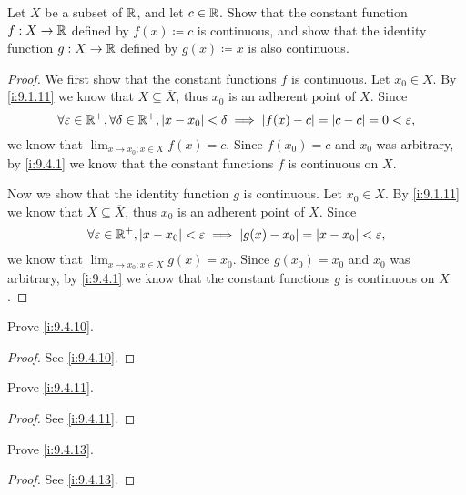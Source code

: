 \begin{ex}\label{i:ex:9.4.2}
  Let \(X\) be a subset of \(\mathbb{R}\), and let \(c \in \mathbb{R}\).
  Show that the constant function \(f : X \to \mathbb{R}\) defined by \(f(x) \coloneqq c\) is continuous, and show that the identity function \(g : X \to \mathbb{R}\) defined by \(g(x) \coloneqq x\) is also continuous.
\end{ex}

\begin{proof}
  We first show that the constant functions \(f\) is continuous.
  Let \(x_0 \in X\).
  By \cref{i:9.1.11} we know that \(X \subseteq \overline{X}\), thus \(x_0\) is an adherent point of \(X\).
  Since
  \[
    \forall \varepsilon \in \mathbb{R}^+, \forall \delta \in \mathbb{R}^+, \left\lvert x - x_0\right\rvert < \delta \implies \left\lvert f(x) - c\right\rvert = \left\lvert c - c\right\rvert = 0 < \varepsilon,
  \]
  we know that \(\lim_{x \to x_0 ; x \in X} f(x) = c\).
  Since \(f(x_0) = c\) and \(x_0\) was arbitrary, by \cref{i:9.4.1} we know that the constant functions \(f\) is continuous on \(X\).

  Now we show that the identity function \(g\) is continuous.
  Let \(x_0 \in X\).
  By \cref{i:9.1.11} we know that \(X \subseteq \overline{X}\), thus \(x_0\) is an adherent point of \(X\).
  Since
  \[
    \forall \varepsilon \in \mathbb{R}^+, \left\lvert x - x_0\right\rvert < \varepsilon \implies \left\lvert g(x) - x_0\right\rvert = \left\lvert x - x_0\right\rvert < \varepsilon,
  \]
  we know that \(\lim_{x \to x_0 ; x \in X} g(x) = x_0\).
  Since \(g(x_0) = x_0\) and \(x_0\) was arbitrary, by \cref{i:9.4.1} we know that the constant functions \(g\) is continuous on \(X\).
\end{proof}

\begin{ex}\label{i:ex:9.4.3}
  Prove \cref{i:9.4.10}.
\end{ex}

\begin{proof}
  See \cref{i:9.4.10}.
\end{proof}

\begin{ex}\label{i:ex:9.4.4}
  Prove \cref{i:9.4.11}.
\end{ex}

\begin{proof}
  See \cref{i:9.4.11}.
\end{proof}

\begin{ex}\label{i:ex:9.4.5}
  Prove \cref{i:9.4.13}.
\end{ex}

\begin{proof}
  See \cref{i:9.4.13}.
\end{proof}


